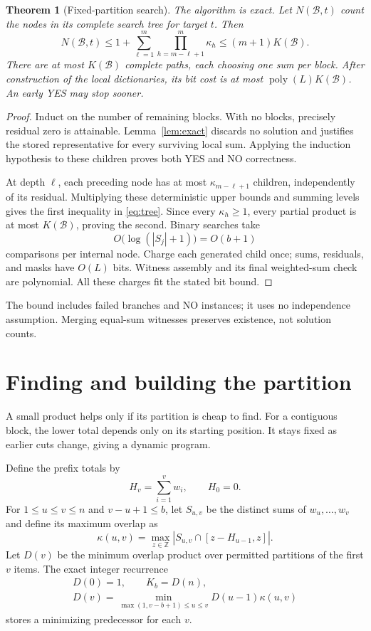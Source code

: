 \documentclass[10pt]{article}
\newtheorem{theorem}{Theorem}
\newcommand{\poly}{\operatorname{poly}}
\begin{document}
\begin{theorem}[Fixed-partition search]\label{thm:search}
The algorithm is exact. Let $N(\mathcal B,t)$ count the nodes in its
complete search tree for target $t$. Then
\begin{equation}\label{eq:tree}
 N(\mathcal B,t)\le
 1+\sum_{\ell=1}^m\prod_{h=m-\ell+1}^m\kappa_h
 \le(m+1)K(\mathcal B).
\end{equation}
There are at most $K(\mathcal B)$ complete paths, each choosing one sum per block.
After construction of the
local dictionaries, its bit cost is at most $\poly(L)K(\mathcal B)$.
An early YES may stop sooner.
\end{theorem}
\begin{proof}
Induct on the number of remaining blocks. With no blocks, precisely residual
zero is attainable. Lemma~\ref{lem:exact} discards no solution and justifies
the stored representative for every surviving local sum. Applying the
induction hypothesis to these children proves both YES and NO correctness.

At depth $\ell$, each preceding node has at most $\kappa_{m-\ell+1}$
children, independently of its residual. Multiplying these deterministic
upper bounds and summing levels gives the first inequality in
\eqref{eq:tree}. Since every $\kappa_h\ge1$, every partial product is at
most $K(\mathcal B)$, proving the second. Binary searches take
\[
 O\bigl(\log(|S_j|+1)\bigr)=O(b+1)
\]
comparisons per internal node.
Charge each generated child once; sums, residuals, and masks have $O(L)$
bits. Witness assembly and its final weighted-sum check are polynomial.
All these charges fit the stated bit bound.
\end{proof}

The bound includes failed branches and NO instances; it uses no independence
assumption. Merging equal-sum witnesses preserves existence, not solution counts.

\section{Finding and building the partition}
A small product helps only if its partition is cheap to find.
For a contiguous block, the lower total depends only on its starting
position. It stays fixed as earlier cuts change, giving a dynamic program.

Define the prefix totals by
\[
 H_v=\sum_{i=1}^vw_i,\qquad H_0=0.
\]
For $1\le u\le v\le n$ and
$v-u+1\le b$, let $S_{u,v}$ be the distinct sums of $w_u,\ldots,w_v$ and
define its maximum overlap as
\[
 \kappa(u,v)=\max_{z\in\mathbb Z}|S_{u,v}\cap[z-H_{u-1},z]|.
\]
Let $D(v)$ be the minimum overlap product over permitted partitions of the first $v$ items.
The exact integer recurrence
\begin{equation}\label{eq:dp}
 \begin{gathered}
 D(0)=1,\qquad K_b=D(n),\\[3pt]
 D(v)=\min_{\max(1,v-b+1)\le u\le v}
          D(u-1)\kappa(u,v)
 \end{gathered}
\end{equation}
stores a minimizing predecessor for each $v$.
\end{document}
